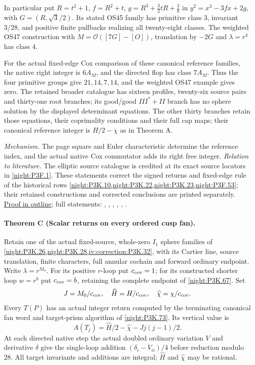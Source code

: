 In particular put $R=t^2+1$, $f=R^2+t$,
$g=R^3+\tfrac32tR+\tfrac38$ in
$y^2=x^3-3fx+2g$, with $G=(R,\sqrt3/2)$.
Its stated OS45 family has primitive class $3$, invariant $3/28$,
and positive finite pullbacks realizing all twenty-eight classes.
The weighted OS47 construction with $M=\mathcal O([7G]-[O])$,
translation by $-2G$ and $\lambda=r^4$ has class $4$.

For the actual fixed-edge Cox comparison of these canonical reference
families, the native right integer is $6A_M$, and the directed flop
has class $7A_M$. Thus the four primitive groups give
$21,14,7,14$, and the weighted OS47 example gives zero.
The retained broader catalogue has sixteen profiles, twenty-six source
pairs and thirty-one root branches; its good/good $III^*+II$ branch
has no sphere solution by the displayed determinant equations.
The other thirty branches retain those equations, their coprimality
conditions and their full cap maps; their canonical reference integer
is $H/2-\chi$ as in Theorem A.

\textit{Mechanism.} The page square and Euler characteristic determine the reference
index, and the actual native Cox commutator adds its right free integer.
\textit{Relation to literature.} The elliptic source catalogue is credited at its exact source
locators in \cref{night:P3F.1}. These statements correct the signed
returns and fixed-edge rule of the historical rows
\cref{night:P3K.10,night:P3K.22,night:P3K.23,night:P3F.53}; their
retained constructions and corrected conclusions are printed separately.
\hyperlink{outline-IV-B}{Proof in outline}; full statements: , , , , , .

\hypertarget{main-IV-C}{}
\paragraph{Theorem C (Scalar returns on every ordered cusp fan).}
\label{series:IV:C}
Retain one of the actual fixed-source, whole-zero $I_1$ sphere families
of \cref{night:P3K.26,night:P3K.28,iv:correction:P3K.32}, with
its Cartier line, source translation, finite characters, full annular
cochain and forward ordinary endpoint. Write $\lambda=r^{M_0}$.
For its positive $r$-loop put $c_{\rm cov}=1$; for its constructed
shorter loop $w=r^b$ put $c_{\rm cov}=b$, retaining the complete
endpoint of \cref{night:P3K.67}. Set
\[
 J=M_0/c_{\rm cov},\quad \widehat H=H/c_{\rm cov},\quad
 \widehat\chi=\chi/c_{\rm cov}.
\]
Every $T(P)$ has an actual integer return computed by the terminating
canonical fan word and target-prism algorithm of
\cref{night:P3K.73}. Its vertical value is
\[
 A(T_j)=\widehat H/2-\widehat\chi-Jj(j-1)/2.
\]
At each directed native step the actual doubled ordinary variation
$V$ and derivative $\delta$ give the single-loop addition
$(\delta_i-V_{ii})/4$ before reduction modulo $28$.
All target invariants and additions are integral; $\widehat H$ and
$\widehat\chi$ may be rational.

